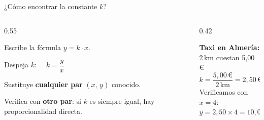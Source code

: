 \documentclass[aspectratio=169, 10pt, spanish]{beamer}
\begin{document}
\begin{frame}{¿Cómo encontrar la constante $k$?}
  \begin{columns}[c]
    \begin{column}{0.55\textwidth}
      \begin{pasobox}[1]
        Escribe la fórmula $y = k \cdot x$.
      \end{pasobox}
      \vspace{0.2cm}
      \begin{pasobox}[2]
        Despeja $k$: $\quad k = \dfrac{y}{x}$
      \end{pasobox}
      \vspace{0.2cm}
      \begin{pasobox}[3]
        Sustituye \textbf{cualquier par} $(x,\,y)$ conocido.
      \end{pasobox}
      \vspace{0.2cm}
      \begin{pasobox}[4]
        Verifica con \textbf{otro par}: si $k$ es siempre igual, hay proporcionalidad directa.
      \end{pasobox}
    \end{column}
    \begin{column}{0.42\textwidth}
      \begin{ejemplobox}
        \textbf{Taxi en Almería:}\\
        2\,km cuestan 5{,}00\,€\\[4pt]
        $k = \dfrac{5{,}00\,\text{€}}{2\,\text{km}} = 2{,}50\,\text{€}/\text{km}$\\[4pt]
        Verificamos con $x=4$:\\
        $y = 2{,}50 \times 4 = 10{,}00\,\text{€}$ \correcto
      \end{ejemplobox}
    \end{column}
  \end{columns}
\end{frame}
\end{document}
